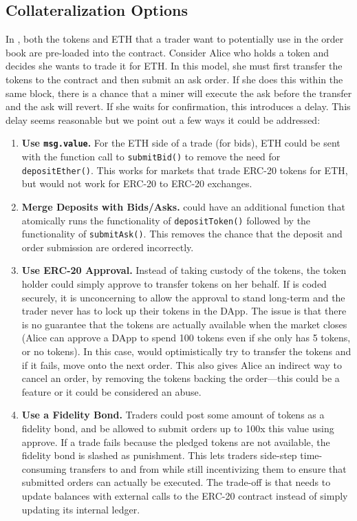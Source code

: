 \subsection{Collateralization Options}

In \cm, both the tokens and ETH that a trader want to potentially use in the order book are pre-loaded into the contract. Consider Alice who holds a token and decides she wants to trade it for ETH. In this model, she must first transfer the tokens to the contract and then submit an ask order. If she does this within the same block, there is a chance that a miner will execute the ask before the transfer and the ask will revert. If she waits for confirmation, this introduces a delay. This delay seems reasonable but we point out a few ways it could be addressed: 

\begin{enumerate}

\item \textbf{Use \texttt{msg.value}.} For the ETH side of a trade (\ie for bids), ETH could be sent with the function call to \texttt{submitBid()} to remove the need for    \texttt{depositEther()}. This works for markets that trade ERC-20 tokens for ETH, but would not work for ERC-20 to ERC-20 exchanges. 

\item \textbf{Merge Deposits with Bids/Asks.} \cm could have an additional function that atomically runs the functionality of \texttt{depositToken()} followed by the functionality of \texttt{submitAsk()}. This removes the chance that the deposit and order submission are ordered incorrectly.

\item \textbf{Use ERC-20 Approval.} Instead of \cm taking custody of the tokens, the token holder could simply approve \cm to transfer tokens on her behalf. If \cm is coded securely, it is unconcerning to allow the approval to stand long-term and the trader never has to lock up their tokens in the DApp. The issue is that there is no guarantee that the tokens are actually available when the market closes (\ie Alice can approve a DApp to spend 100 tokens even if she only has 5 tokens, or no tokens). In this case, \cm would optimistically try to transfer the tokens and if it fails, move onto the next order. This also gives Alice an indirect way to cancel an order, by removing the tokens backing the order---this could be a feature or it could be considered an abuse.

\item \textbf{Use a Fidelity Bond.} Traders could post some amount of tokens as a fidelity bond, and be allowed to submit orders up to 100x this value using approve. If a trade fails because the pledged tokens are not available, the fidelity bond is slashed as punishment. This lets traders side-step time-consuming transfers to and from \cm while still incentivizing them to ensure that submitted orders can actually be executed. The trade-off  is that \cm needs to update balances with external calls to the ERC-20 contract instead of simply updating its internal ledger. 

\end{enumerate}

